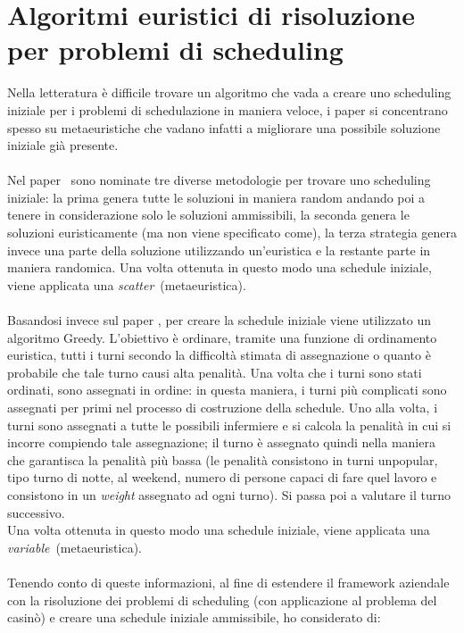 \section{Algoritmi euristici di risoluzione per problemi di scheduling}
Nella letteratura è difficile trovare un algoritmo che vada a creare uno scheduling iniziale per i problemi di schedulazione in maniera veloce, i paper si concentrano spesso su metaeuristiche che vadano infatti a migliorare una possibile soluzione iniziale già presente. \\
\\
Nel paper \cite{paper:crew-rostering}\ sono nominate tre diverse metodologie per trovare uno scheduling iniziale: la prima genera tutte le soluzioni in maniera random andando poi a tenere in considerazione solo le soluzioni ammissibili, la seconda genera le soluzioni euristicamente (ma non viene specificato come), la terza strategia genera invece una parte della soluzione utilizzando un’euristica e la restante parte in maniera randomica. Una volta ottenuta in questo modo una schedule iniziale, viene applicata una \emph{\gls{scatter}}\glsfirstoccur\ (metaeuristica).\\
\\
Basandosi invece sul paper \cite{paper:nurse-rostering}, per creare la schedule iniziale viene utilizzato un algoritmo Greedy.
L’obiettivo è ordinare, tramite una funzione di ordinamento euristica, tutti i turni secondo la difficoltà stimata di assegnazione o quanto è probabile che tale turno causi alta penalità. 
Una volta che i turni sono stati ordinati, sono assegnati in ordine: in questa maniera, i turni più complicati sono assegnati per primi nel processo di costruzione della schedule. Uno alla volta, i turni sono assegnati a tutte le possibili infermiere e si calcola la penalità in cui si incorre compiendo tale assegnazione; il turno è assegnato quindi nella maniera che garantisca la penalità più bassa (le penalità consistono in turni unpopular, tipo turno di notte, al weekend, numero di persone capaci di fare quel lavoro e consistono in un \textit{weight} assegnato ad ogni turno). Si passa poi a valutare il turno successivo.\\
Una volta ottenuta in questo modo una schedule iniziale, viene applicata una \emph{\gls{variable}}\glsfirstoccur\ (metaeuristica).
\\ \\
Tenendo conto di queste informazioni, al fine di estendere il framework aziendale con la risoluzione dei problemi di scheduling (con applicazione al problema del casinò) e creare una schedule iniziale ammissibile, ho considerato di:

